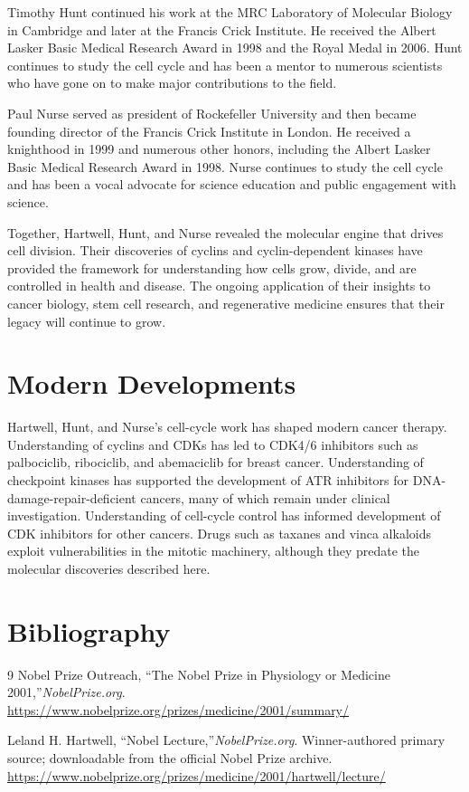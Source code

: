 Timothy Hunt continued his work at the MRC Laboratory of Molecular Biology in Cambridge and later at the Francis Crick Institute. He received the Albert Lasker Basic Medical Research Award in 1998 and the Royal Medal in 2006. Hunt continues to study the cell cycle and has been a mentor to numerous scientists who have gone on to make major contributions to the field.

Paul Nurse served as president of Rockefeller University and then became founding director of the Francis Crick Institute in London. He received a knighthood in 1999 and numerous other honors, including the Albert Lasker Basic Medical Research Award in 1998. Nurse continues to study the cell cycle and has been a vocal advocate for science education and public engagement with science.

Together, Hartwell, Hunt, and Nurse revealed the molecular engine that drives cell division. Their discoveries of cyclins and cyclin-dependent kinases have provided the framework for understanding how cells grow, divide, and are controlled in health and disease. The ongoing application of their insights to cancer biology, stem cell research, and regenerative medicine ensures that their legacy will continue to grow.


\section{Modern Developments}

Hartwell, Hunt, and Nurse's cell-cycle work has shaped modern cancer therapy. Understanding of cyclins and CDKs has led to CDK4/6 inhibitors such as palbociclib, ribociclib, and abemaciclib for breast cancer. Understanding of checkpoint kinases has supported the development of ATR inhibitors for DNA-damage-repair-deficient cancers, many of which remain under clinical investigation. Understanding of cell-cycle control has informed development of CDK inhibitors for other cancers. Drugs such as taxanes and vinca alkaloids exploit vulnerabilities in the mitotic machinery, although they predate the molecular discoveries described here.


\section{Bibliography}

\begin{thebibliography}{9}
Nobel Prize Outreach, ``The Nobel Prize in Physiology or Medicine 2001,''\emph{NobelPrize.org}.\\
\url{https://www.nobelprize.org/prizes/medicine/2001/summary/}

Leland H. Hartwell, ``Nobel Lecture,''\emph{NobelPrize.org}. Winner-authored primary source; downloadable from the official Nobel Prize archive.\\
\url{https://www.nobelprize.org/prizes/medicine/2001/hartwell/lecture/}
\end{thebibliography}
